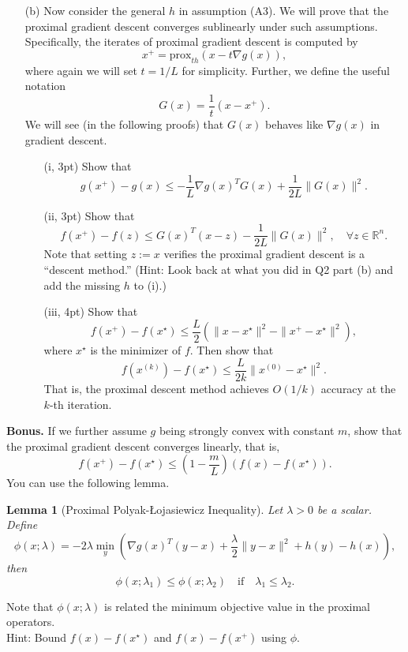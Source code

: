 \documentclass{article}
\newtheorem{lemma}{Lemma}
\theoremstyle{remark}
\theoremstyle{definition}
\begin{document}
\begin{enumerate}
\item[(b)] 
Now consider the general $h$ in assumption (A3).
We will prove that the proximal gradient descent converges sublinearly under such assumptions.
Specifically, the iterates of proximal gradient descent is computed by
\begin{equation}
x^{+} = \textrm{prox}_{t h} \left( x - t \nabla g(x) \right), \label{eq:q3:2}
\end{equation}
where again we will set $t=1/L$ for simplicity. Further, we define the useful
notation 
    \[
            G(x) = \frac{1}{t}\left(x-x^+\right).
    \]
                We will see (in the following proofs) that $G(x)$ behaves like $\nabla g(x)$ in gradient descent.
    \begin{enumerate}
    \item[(i, 3pt)] Show that
    \[
            g(x^+)-g(x) \le -\frac{1}{L}\nabla g(x)^TG(x)+\frac{1}{2L}\|G(x)\|^2.
    \]
    \item[(ii, 3pt)] Show that 
    \[ 
                    f(x^+)-f(z) \leq G(x)^T(x-z) - \frac{1}{2L}\|G(x)\|^2,\quad\forall z\in\mathbb{R}^n.
    \]
    Note that setting $z:=x$ verifies the proximal gradient descent is a ``descent method.''
    (Hint: Look back at what you did in Q2 part (b) and add the missing $h$ to (i).)
    \item[(iii, 4pt)] Show that
    \[
            f(x^+)-f(x^\star) \leq \frac{L}{2}\left(\|x-x^\star\|^2-\|x^+-x^\star\|^2\right),
    \]
    where $x^\star$ is the minimizer of $f$.
    Then show that 
    \[
            f(x^{(k)}) - f(x^\star) \leq \frac{L}{2k}\|x^{(0)}-x^\star\|^2.
    \]
    That is, the proximal descent method achieves $O(1/k)$ accuracy at the $k$-th iteration.
    \end{enumerate}

\end{enumerate}
{\bf Bonus.} If we further assume $g$ being strongly convex with constant $m$, show that
the proximal gradient descent converges linearly, that is,
\[
        f(x^+)-f(x^\star) \le \left(1-\frac{m}{L}\right) \left(f(x)-f(x^\star)\right).
\]
You can use the following lemma.
\begin{lemma}[Proximal Polyak-\L{}ojasiewicz Inequality]\label{lemma:PL}
        Let $\lambda>0$ be a scalar. Define
        \[
                \phi(x;\lambda) = -2\lambda\min_{y} \left(\nabla g(x)^T(y-x)+\frac{\lambda}{2}\|y-x\|^2+h(y)-h(x)\right),
        \]
        then
        \[
                \phi(x;\lambda_1) \leq \phi(x;\lambda_2)\quad\text{if}\quad \lambda_1\leq\lambda_2.
        \]
\end{lemma}
Note that $\phi(x;\lambda)$ is related the minimum objective value in the proximal operators.\\
Hint: Bound $f(x)-f(x^\star)$ and $f(x)-f(x^+)$ using $\phi$.
\end{document}

